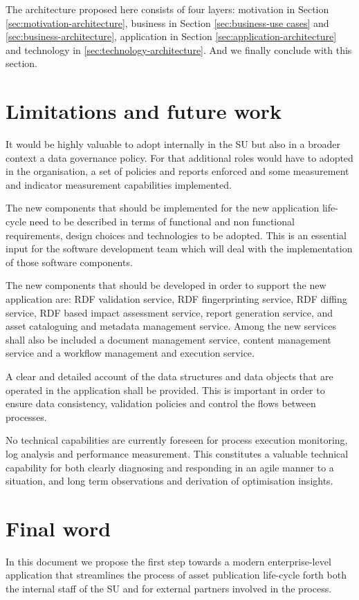 	The architecture proposed here consists of four layers: motivation in Section \ref{sec:motivation-architecture}, business in Section \ref{sec:business-use cases} and \ref{sec:business-architecture}, application in Section \ref{sec:application-architecture} and technology in \ref{sec:technology-architecture}. And we finally conclude with this section.
	
	\section{Limitations and future work}
	
	It would be highly valuable to adopt internally in the SU but also in a broader context a data governance policy. For that additional roles would have to adopted in the organisation, a set of policies and reports enforced and some measurement and indicator measurement capabilities implemented. 
	
	The new components that should be implemented for the new application life-cycle need to be described in terms of functional and non functional requirements, design choices and technologies to be adopted. This is an essential input for the software development team which will deal with the implementation of those software components. 
	
	The new components that should be developed in order to support the new application are: RDF validation service, RDF fingerprinting service, RDF diffing service, RDF based impact assessment service, report generation service, and asset cataloguing and metadata management service. Among the new services shall also be included a document management service, content management service and a workflow management and execution service. 
	
	A clear and detailed account of the data structures and data objects that are operated in the application shall be provided. This is important in order to ensure data consistency, validation policies and control the flows between processes. 
	
	No technical capabilities are currently foreseen for process execution monitoring, log analysis and performance measurement. This constitutes a valuable technical capability for both clearly diagnosing and responding in an agile manner to a situation, and long term observations and derivation of optimisation insights.
	
    \section{Final word}
    In this document we propose the first step towards a modern enterprise-level application that streamlines the process of asset publication life-cycle forth both the internal staff of the SU and for external partners involved in the process. 
    
